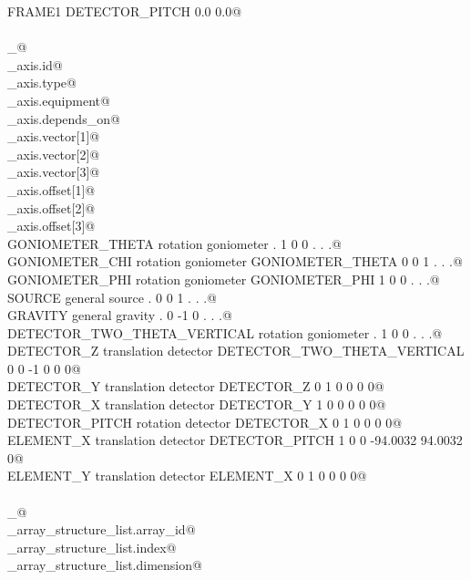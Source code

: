 \documentclass[10pt,a4paper,twoside,notitlepage]{article}
\begin{document}
\begin{flushleft}
\begin{list}{}{}
\mbox{}\verb@ FRAME1 DETECTOR_PITCH 0.0 0.0@\\
\mbox{}\verb@@\\
\mbox{}\verb@loop_@\\
\mbox{}\verb@_axis.id@\\
\mbox{}\verb@_axis.type@\\
\mbox{}\verb@_axis.equipment@\\
\mbox{}\verb@_axis.depends_on@\\
\mbox{}\verb@_axis.vector[1]@\\
\mbox{}\verb@_axis.vector[2]@\\
\mbox{}\verb@_axis.vector[3]@\\
\mbox{}\verb@_axis.offset[1]@\\
\mbox{}\verb@_axis.offset[2]@\\
\mbox{}\verb@_axis.offset[3]@\\
\mbox{}\verb@ GONIOMETER_THETA rotation goniometer . 1 0 0 . . .@\\
\mbox{}\verb@ GONIOMETER_CHI rotation goniometer GONIOMETER_THETA 0 0 1 . . .@\\
\mbox{}\verb@ GONIOMETER_PHI rotation goniometer GONIOMETER_PHI 1 0 0 . . .@\\
\mbox{}\verb@ SOURCE general source . 0 0 1 . . .@\\
\mbox{}\verb@ GRAVITY general gravity . 0 -1 0 . . .@\\
\mbox{}\verb@ DETECTOR_TWO_THETA_VERTICAL rotation goniometer . 1 0 0 . . .@\\
\mbox{}\verb@ DETECTOR_Z translation detector DETECTOR_TWO_THETA_VERTICAL 0 0 -1 0 0 0@\\
\mbox{}\verb@ DETECTOR_Y translation detector DETECTOR_Z 0 1 0 0 0 0@\\
\mbox{}\verb@ DETECTOR_X translation detector DETECTOR_Y 1 0 0 0 0 0@\\
\mbox{}\verb@ DETECTOR_PITCH rotation detector DETECTOR_X 0 1 0 0 0 0@\\
\mbox{}\verb@ ELEMENT_X translation detector DETECTOR_PITCH 1 0 0 -94.0032 94.0032 0@\\
\mbox{}\verb@ ELEMENT_Y translation detector ELEMENT_X 0 1 0 0 0 0@\\
\mbox{}\verb@@\\
\mbox{}\verb@loop_@\\
\mbox{}\verb@_array_structure_list.array_id@\\
\mbox{}\verb@_array_structure_list.index@\\
\mbox{}\verb@_array_structure_list.dimension@\\

\end{list}
\end{flushleft}
\end{document}
